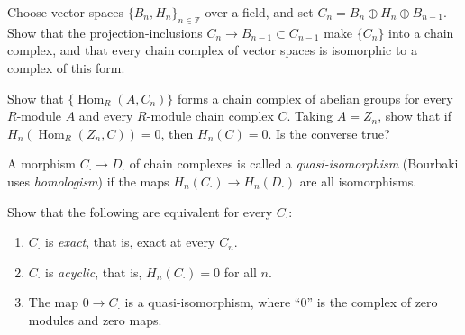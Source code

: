 \begin{exercise}
  Choose vector spaces $\{B_n, H_n\}_{n \in \mathbb{Z}}$ over a field, and set $C_n = B_n \oplus H_n \oplus B_{n - 1}$. Show that the projection-inclusions $C_n \to B_{n - 1} \subset C_{n - 1}$ make $\{C_n\}$ into a chain complex, and that every chain complex of vector spaces is isomorphic to a complex of this form.
\end{exercise}

\begin{exercise}
  Show that $\{\operatorname{Hom}_R(A, C_n)\}$ forms a chain complex of abelian groups for every $R$-module $A$ and every $R$-module chain complex $C$. Taking $A = Z_n$, show that if $H_n(\operatorname{Hom}_R(Z_n, C)) = 0$, then $H_n(C) = 0$. Is the converse true?
\end{exercise}

\begin{definition}
  A morphism $C_\cdot \to D_\cdot$ of chain complexes is called a \emph{quasi-isomorphism} (Bourbaki uses \emph{homologism}) if the maps $H_n(C_\cdot) \to H_n(D_\cdot)$ are all isomorphisms.
\end{definition}

\begin{exercise}
  Show that the following are equivalent for every $C_\cdot$:
  \begin{enumerate}
    \item $C_\cdot$ is \emph{exact}, that is, exact at every $C_n$.
    \item $C_\cdot$ is \emph{acyclic}, that is, $H_n(C_\cdot) = 0$ for all $n$.
    \item The map $0 \to C_\cdot$ is a quasi-isomorphism, where \enquote{$0$} is the complex of zero modules and zero maps.
  \end{enumerate}
\end{exercise}
